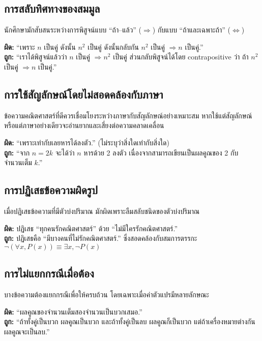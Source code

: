 \subsection*{การสลับทิศทางของสมมูล}
นักศึกษามักสับสนระหว่างการพิสูจน์แบบ “ถ้า–แล้ว” ($\Rightarrow$) กับแบบ “ถ้าและเฉพาะถ้า” ($\Leftrightarrow$)  
\begin{exam}
	\textbf{ผิด:} “เพราะ $n$ เป็นคู่ ดังนั้น $n^2$ เป็นคู่ ดังนั้นกลับกัน $n^2$ เป็นคู่ $\Rightarrow n$ เป็นคู่.”\\
	\textbf{ถูก:} “เราได้พิสูจน์แล้วว่า $n$ เป็นคู่ $\Rightarrow n^2$ เป็นคู่ ส่วนกลับพิสูจน์ได้โดย contrapositive ว่า ถ้า $n^2$ เป็นคู่ $\Rightarrow n$ เป็นคู่.”
\end{exam}

\subsection*{การใช้สัญลักษณ์โดยไม่สอดคล้องกับภาษา}
ข้อความคณิตศาสตร์ที่ดีควรเชื่อมโยงระหว่างภาษากับสัญลักษณ์อย่างเหมาะสม หากใช้แต่สัญลักษณ์หรือแต่ภาษาอย่างเดียวจะอ่านยากและเสี่ยงต่อความคลาดเคลื่อน  
\begin{exam}
	\textbf{ผิด:} “เพราะเท่ากับเลยหารได้ลงตัว.” (ไม่ระบุว่าสิ่งใดเท่ากับสิ่งใด)\\
	\textbf{ถูก:} “จาก $n = 2k$ จะได้ว่า $n$ หารด้วย 2 ลงตัว เนื่องจากสามารถเขียนเป็นผลคูณของ 2 กับจำนวนเต็ม $k$.”
\end{exam}

\subsection*{การปฏิเสธข้อความผิดรูป}
เมื่อปฏิเสธข้อความที่มีตัวบ่งปริมาณ มักผิดเพราะลืมสลับชนิดของตัวบ่งปริมาณ  
\begin{exam}
	\textbf{ผิด:} ปฏิเสธ “ทุกคนรักคณิตศาสตร์” ด้วย “ไม่มีใครรักคณิตศาสตร์.”\\
	\textbf{ถูก:} ปฏิเสธคือ “มีบางคนที่ไม่รักคณิตศาสตร์.” ซึ่งสอดคล้องกับสมการตรรกะ $\neg(\forall x, P(x)) \equiv \exists x, \neg P(x)$
\end{exam}

\subsection*{การไม่แยกกรณีเมื่อต้อง}
บางข้อความต้องแยกกรณีเพื่อให้ครบถ้วน โดยเฉพาะเมื่อค่าตัวแปรมีหลายลักษณะ  
\begin{exam}
	\textbf{ผิด:} “ผลคูณของจำนวนเต็มสองจำนวนเป็นบวกเสมอ.”\\
	\textbf{ถูก:} “ถ้าทั้งคู่เป็นบวก ผลคูณเป็นบวก และถ้าทั้งคู่เป็นลบ ผลคูณก็เป็นบวก แต่ถ้าเครื่องหมายต่างกัน ผลคูณจะเป็นลบ.”
\end{exam}

